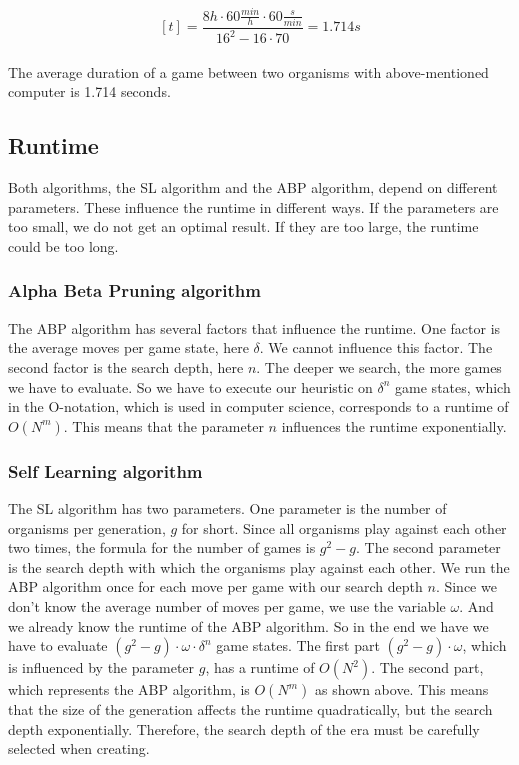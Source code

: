 $$ [t] =  \frac{8h \cdot 60\frac{min}{h} \cdot 60\frac{s}{min}}{16^2 - 16 \cdot 70} = 1.714s$$\\
The average duration of a game between two organisms with above-mentioned computer is 1.714 seconds.

\subsection{Runtime}
Both algorithms, the \ac{SL} algorithm and the \ac{ABP} algorithm, depend on different parameters. These influence the runtime in different ways. If the parameters are too small, we do not get an optimal result. If they are too large, the runtime could be too long.

\subsubsection{Alpha Beta Pruning algorithm}
The \ac{ABP} algorithm has several factors that influence the runtime. One factor is the average moves per game state, here $\delta$. We cannot influence this factor. The second factor is the search depth, here $n$. The deeper we search, the more games we have to evaluate. So we have to execute our heuristic on $\delta^n$ game states, which in the O-notation, which is used in computer science, corresponds to a runtime of $O(N^{m})$. This means that the parameter $n$ influences the runtime exponentially.

\subsubsection{Self Learning algorithm}
The \ac{SL} algorithm has two parameters. One parameter is the number of organisms per generation, $g$ for short. Since all organisms play against each other two times, the formula for the number of games is $g^2 - g$.  The second parameter is the search depth with which the organisms play against each other. We run the \ac{ABP} algorithm once for each move per game with our search depth $n$. Since we don't know the average number of moves per game, we use the variable $\omega$.  And we already know the runtime of the \ac{ABP} algorithm. So in the end we have we have to evaluate $(g^2 - g) \cdot \omega \cdot \delta^n$ game states. The first part $(g^2 - g) \cdot \omega$, which is influenced by the parameter $g$, has a runtime of $O(N^2)$. The second part, which represents the \ac{ABP} algorithm, is $O(N^m)$ as shown above. This means that the size of the generation affects the runtime quadratically, but the search depth exponentially. Therefore, the search depth of the era must be carefully selected when creating.


